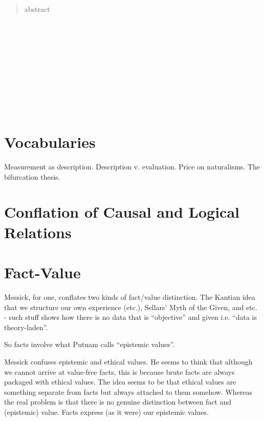 \documentclass[11pt,twoside]{article}
\begin{document}
\begin{abstract}
abstract
\end{abstract}

\noindent
\cite{abell_narrative_2004} \\
\cite{crane_mental_1995} \\
\cite{gross_pragmatist_2009} \\
\cite{jackson_mental_1996} \\
\cite{lowe_causal_1993} \\
\cite{lowe_non-cartesian_2006} \\
\cite{macdonald_mental_1986} \\
\cite{menzies_causation_1993} \\
\cite{morris_causes_1986} \\
\cite{williamson_broadness_1998}

\section{Vocabularies}

Measurement as description.  Description v. evaluation.  Price on
naturalisms.  The bifurcation thesis.

\section{Conflation of Causal and Logical Relations}



\section{Fact-Value}

Messick, for one, conflates two kinds of fact/value distinction.  The
Kantian idea that we structure our own experience (etc.), Sellars'
Myth of the Given, and etc. - such stuff shows how there is no data
that is ``objective'' and given i.e. ``data is theory-laden''.

So facts involve what Putnam calls ``epistemic values''.

Messick confuses epistemic and ethical values.  He seems to think that
although we cannot arrive at value-free facts, this is because brute
facts are always packaged with ethical values.  The idea seems to be
that ethical values are something separate from facts but always
attached to them somehow.  Whereas the real problem is that there is
no genuine distinction between fact and (epistemic) value.  Facts
express (as it were) our epistemic values.
\end{document}
